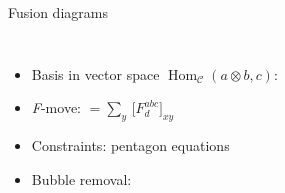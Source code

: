 \documentclass{fdubeamer}
\newcommand{\tikzinput}[1]{}
\newcommand{\1}{\mathbb{1}}
\begin{document}
\begin{frame}{Fusion diagrams}

\linespread{1.4}
\selectfont

\begin{columns}[c]


    \begin{itemize}
      \item Basis in vector space $\operatorname{Hom}_{\mathcal{C}}(a\otimes b,c)$:
            \tikzinput{category/fusion-tree-1}
      \item \textit{F}-move:
            $\tikzinput{category/f-symbol-1} = \sum_y \, \bigl[ F^{abc}_d \bigr]_{xy} \tikzinput{category/f-symbol-2}$
      \item Constraints: pentagon equations
      \item Bubble removal: \\
            \mbox{\qquad} $\tikzinput{category/loop-removal}$
    \end{itemize}


    \centering
    \tikzinput{category/f-symbols-pentagon-equation-narrow}

\end{columns}

\end{frame}
\end{document}
